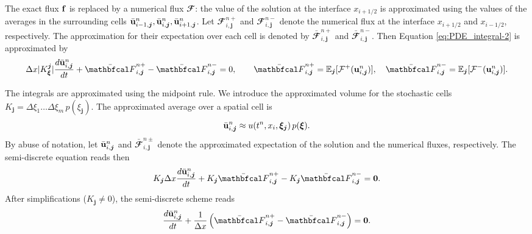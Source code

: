 \documentclass{article}
\newcommand{\bfu}{ {\bf u} }
\newcommand{\ibfj}{ {\boldsymbol{j}  } }
\newcommand{\bfxi}{ {\bm \xi} }
\newcommand{\bff}{ {\bf f} }
\newcommand{\bfzero}{ {\bm 0} }
\newcommand{\E}{ \mathbb E }
\newcommand{\flux}[4]{ {\mathbfcal F}_{ {#1},{#2} }^{ {#3} {#4}} }
\newcommand{\fluxE}[4]{ \bar{\mathbfcal F}_{ {#1},{#2} }^{ {#3} {#4}} }
\begin{document}
The exact flux $\bff$ is replaced by a numerical flux $\mathbfcal F$: 
the value of the solution at the interface $x_{i+1/2}$ is 
approximated using the values of the averages in the surrounding cells 
$\bar \bfu_{i-1,\ibfj}^n , \bar \bfu_{i,\ibfj}^n , \bar \bfu_{i+1,\ibfj}^n $. 
Let $\flux{i}{\ibfj}{n}{+}$ and $\flux{i}{\ibfj}{n}{-}$ denote the numerical flux at the interface 
$x_{i+1/2}$ and $x_{i-1/2}$, respectively. 
The approximation for their expectation over each cell is denoted by $\fluxE{i}{\ibfj}{n}{+}$ and $\fluxE{i}{\ibfj}{n}{-}$. Then Equation \eqref{eq:PDE_integral-2} is approximated by
\begin{equation} \label{eq:PDE_numFlux}
    \Delta x |K_\bfxi^\ibfj| \frac{d \bar \bfu_{i,\ibfj}^n }{d t}
    + \fluxE{i}{\ibfj}{n}{+} - \fluxE{i}{\ibfj}{n}{-}
    = 0, 
    \qquad \fluxE{i}{\ibfj}{n}{+}
    = \E_\ibfj [ \mathcal F^+(\bfu_{i,\ibfj}^n ) ] , 
    \quad \fluxE{i}{\ibfj}{n}{-}
    = \E_\ibfj [ \mathcal F^-(\bfu_{i,\ibfj}^n ) ].
\end{equation}

The integrals are approximated using the midpoint rule. 
We introduce the approximated volume for the stochastic cells $K_\ibfj=\Delta\xi_1\dots\Delta\xi_m\,p(\xi_\ibfj)$.
The approximated average over a spatial cell is 
\begin{equation} \label{eq:quad_space}
\bar \bfu_{i,\ibfj}^n  \approx 
u(t^n , x_i, \bfxi_\ibfj) \, p(\bfxi).
\end{equation}
By abuse of notation, let $\bar \bfu_{i,\ibfj}^n$ and $\fluxE{i}{\ibfj}{n}{\pm}$ denote the approximated expectation of the solution and the numerical fluxes, respectively.
The semi-discrete equation reads then
\begin{equation} \label{eq:PDE_semiDiscrete}
    K_\ibfj \Delta x \frac{d \bar \bfu_{i,\ibfj}^n }{d t}
    + K_\ibfj \fluxE{i}{\ibfj}{n}{+}
    - K_\ibfj \fluxE{i}{\ibfj}{n}{-}
    = \bfzero.
\end{equation}
After simplifications ($K_\ibfj\neq 0$), the semi-discrete scheme reads 
\begin{equation}
    \frac{d \bar \bfu_{i,\ibfj}^n }{d t}
    + \frac{1}{\Delta x} \left(
        \fluxE{i}{\ibfj}{n}{+} - \fluxE{i}{\ibfj}{n}{-}
    \right)
    = \bfzero.
\end{equation}
\end{document}
